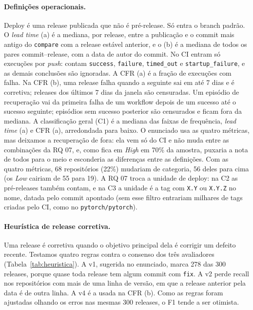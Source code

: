 \documentclass[12pt]{article}
\begin{document}
\paragraph{Definições operacionais.} Deploy é uma release publicada que não é pré-release. Só entra o
branch padrão. O \textit{lead time} (a) é a mediana, por release, entre a publicação e o commit mais
antigo do \texttt{compare} com a release estável anterior, e o (b) é a mediana de todos os pares
commit--release, com a data de autor do commit. No CI entram só execuções por \textit{push}: contam
\texttt{success}, \texttt{failure}, \texttt{timed\_out} e \texttt{startup\_failure}, e as demais
conclusões são ignoradas. A CFR (a) é a fração de execuções com falha. Na CFR (b), uma release falha
quando a seguinte sai em até 7 dias e é corretiva; releases dos últimos 7 dias da janela são
censuradas. Um episódio de recuperação vai da primeira falha de um workflow depois de um sucesso até o
sucesso seguinte; episódios sem sucesso posterior são censurados e ficam fora da mediana. A
classificação geral (C1) é a mediana das faixas de frequência, \textit{lead time} (a) e CFR (a),
arredondada para baixo. O enunciado usa as quatro métricas, mas deixamos a recuperação de fora: ela
vem só do CI e não muda entre as combinações da RQ 07, e, como fica em \textit{High} em 70\% da
amostra, puxaria a nota de todos para o meio e esconderia as diferenças entre as definições. Com as
quatro métricas, 68 repositórios (22\%) mudariam de categoria, 56 deles para cima (os \textit{Low}
cairiam de 55 para 19). A RQ 07 troca a unidade de deploy: na C2 as pré-releases também contam, e na
C3 a unidade é a tag com \texttt{X.Y} ou \texttt{X.Y.Z} no nome, datada pelo commit apontado (sem esse
filtro entrariam milhares de tags criadas pelo CI, como no \texttt{pytorch/pytorch}).

\paragraph{Heurística de release corretiva.} Uma release é corretiva quando o objetivo principal
dela é corrigir um defeito recente. Testamos quatro regras contra o consenso dos três avaliadores
(Tabela~\ref{tab:heuristica}). A v1, sugerida no enunciado, marca 278 das 300 releases, porque quase
toda release tem algum commit com \texttt{fix}. A v2 perde recall nos repositórios com mais de uma
linha de versão, em que a release anterior pela data é de outra linha. A v4 é a usada na CFR (b).
Como as regras foram ajustadas olhando os erros nas mesmas 300 releases, o F1 tende a ser otimista.
\end{document}
